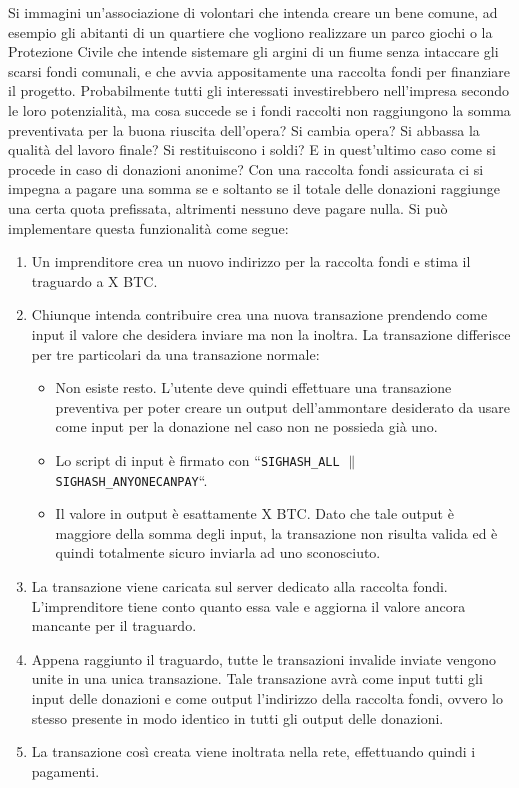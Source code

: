 Si immagini un'associazione di volontari che intenda creare un bene comune, ad esempio gli abitanti di un quartiere che vogliono realizzare un parco giochi o la Protezione Civile che intende sistemare gli argini di un fiume senza intaccare gli scarsi fondi comunali, e che avvia appositamente una raccolta fondi per finanziare il progetto. Probabilmente tutti gli interessati investirebbero nell'impresa secondo le loro potenzialità, ma cosa succede se i fondi raccolti non raggiungono la somma preventivata per la buona riuscita dell'opera? Si cambia opera? Si abbassa la qualità del lavoro finale? Si restituiscono i soldi? E in quest'ultimo caso come si procede in caso di donazioni anonime?
Con una raccolta fondi assicurata ci si impegna a pagare una somma se e soltanto se il totale delle donazioni raggiunge una certa quota prefissata, altrimenti nessuno deve pagare nulla.
Si può implementare questa funzionalità come segue:
\begin{enumerate}
    \item Un imprenditore crea un nuovo indirizzo per la raccolta fondi e stima il traguardo a X BTC.
    \item Chiunque intenda contribuire crea una nuova transazione prendendo come input il valore che desidera inviare ma non la inoltra. La transazione differisce per tre particolari da una transazione normale: \begin{itemize}
        \item Non esiste resto. L'utente deve quindi effettuare una transazione preventiva per poter creare un output dell'ammontare desiderato da usare come input per la donazione nel caso non ne possieda già uno.
        \item Lo script di input è firmato con ``\verb|SIGHASH_ALL| $\|$ \verb|SIGHASH_ANYONECANPAY|``.
        \item Il valore in output è esattamente X BTC. Dato che tale output è maggiore della somma degli input, la transazione non risulta valida ed è quindi totalmente sicuro inviarla ad uno sconosciuto.
    \end{itemize}
    \item La transazione viene caricata sul server dedicato alla raccolta fondi. L'imprenditore tiene conto quanto essa vale e aggiorna il valore ancora mancante per il traguardo.
    \item Appena raggiunto il traguardo, tutte le transazioni invalide inviate vengono unite in una unica transazione. Tale transazione avrà come input tutti gli input delle donazioni e come output l'indirizzo della raccolta fondi, ovvero lo stesso presente in modo identico in tutti gli output delle donazioni.
    \item La transazione così creata viene inoltrata nella rete, effettuando quindi i pagamenti.
\end{enumerate}
